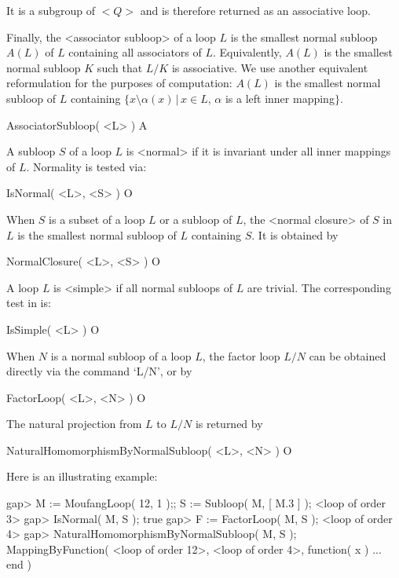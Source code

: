 It is a subgroup of $<Q>$ and is therefore returned as an associative loop.

Finally, the <associator
subloop> of a loop $L$ is
the smallest normal subloop $A(L)$ of $L$ containing all associators of $L$.
Equivalently, $A(L)$ is the smallest normal subloop $K$ such that $L/K$ is
associative. We use another equivalent reformulation for the purposes of
computation: $A(L)$ is the smallest normal subloop of $L$ containing
$\{x\setminus\alpha(x)\,|\,x\in L,\,\alpha$ is a left inner mapping$\}$.

\>AssociatorSubloop( <L> )  A


A subloop $S$ of a loop $L$ is
<normal> if it is invariant under
all inner mappings of $L$. Normality is tested via:

\>IsNormal( <L>, <S> ) O

When $S$ is a subset of a loop $L$ or a subloop of $L$, the <normal
closure> of $S$ in $L$ is the smallest normal subloop of
$L$ containing $S$. It is obtained by

\>NormalClosure( <L>, <S> ) O

A loop $L$ is <simple> if all normal
subloops of $L$ are trivial. The corresponding test in {\LOOPS} is:

\>IsSimple( <L> ) O


When $N$ is a normal subloop of a loop $L$, the factor loop $L/N$ can be
obtained directly via the command `L/N', or by

\>FactorLoop( <L>, <N> ) O

The natural projection from $L$ to $L/N$ is returned by

\>NaturalHomomorphismByNormalSubloop( <L>, <N> ) O

Here is an illustrating example:

\beginexample
gap> M := MoufangLoop( 12, 1 );; S := Subloop( M, [ M.3 ] );
<loop of order 3>
gap> IsNormal( M, S );
true
gap> F := FactorLoop( M, S );
<loop of order 4>
gap> NaturalHomomorphismByNormalSubloop( M, S );
MappingByFunction( <loop of order 12>, <loop of order 4>,
    function( x ) ... end )
\endexample

